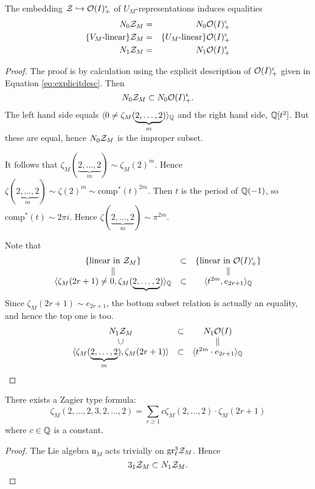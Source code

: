 \begin{prop}
The embedding $\mathcal{Z} \hookrightarrow \mathcal{O}(I)^{\epsilon}_+$ of $U_M$-representations induces equalities
\begin{eqnarray*}
N_0 \mathcal{Z}_M & = & N_0 \mathcal{O}(I)^{\epsilon}_+ \\
\{\textrm{$V_M$-linear}\}\mathcal{Z}_M & = & \{ \textrm{$U_M$-linear} \} \mathcal{O}(I)^{\epsilon}_+ \\
N_1 \mathcal{Z}_M & = & N_1 \mathcal{O}(I)^{\epsilon}_+
\end{eqnarray*}
\end{prop}
\begin{proof}
The proof is by calculation using the explicit description of $\mathcal{O}(I)^{\epsilon}_+$ given in Equation \ref{eq:explicitdesc}. Then
\[
N_0 \mathcal{Z}_M \subset N_0 \mathcal{O}(I)_+^{\epsilon}.
\]
The left hand side equals $\langle 0 \neq \zeta_M(\underbrace{2, \ldots, 2}_m) \rangle_{\mathbb{Q}}$ and the right hand side, $\mathbb{Q}[t^2]$. But these are equal, hence $N_0 \mathcal{Z}_M$ is the improper subset.

\begin{rem}
It follows that $\zeta_M(\underbrace{2, \ldots, 2}_m) \sim \zeta_M(2)^m$. Hence $\zeta(\underbrace{2, \ldots, 2}_m) \sim \zeta(2)^m \sim \mathrm{comp}^*(t)^{2m}$. Then $t$ is the period of $\mathbb{Q}(-1)$, so $\mathrm{comp}^*(t) \sim 2\pi i$. Hence $\zeta(\underbrace{2, \ldots, 2}_m) \sim \pi^{2m}$.
\end{rem}
Note that
\[
\begin{array}{ccc}
\{ \textrm{linear in $\mathcal{Z}_M$} \} & \subset & \{ \textrm{linear in $\mathcal{O}(I)^{\epsilon}_+$} \} \\
\parallel & & \parallel \\
\langle \zeta_M(2r+1) \neq 0, \zeta_M(\underbrace{2,\ldots,2}) \rangle_{\mathbb{Q}} & \subset & \langle t^{2m}, e_{2r+1} \rangle_{\mathbb{Q}}
\end{array}
\]
Since $\zeta_M(2r+1) \sim e_{2r+1}$, the bottom subset relation is actually an equality, and hence the top one is too.
\[
\begin{array}{ccc}
N_1 \mathcal{Z}_M & \subset & N_1 \mathcal{O}(I) \\
\cup & & \parallel \\
\langle \zeta_M(\underbrace{2, \ldots, 2}_m), \zeta_M(2r+1) \rangle & \subset & \langle t^{2m} \cdot e_{2r+1} \rangle_{\mathbb{Q}}
\end{array}
\]
\end{proof}

\begin{cor}
There exists a Zagier type formula:
\[
\zeta_M(2, \ldots, 2, 3, 2, \ldots, 2) = \sum_{r \geq 1} c \zeta_M(2, \ldots, 2) \cdot \zeta_M(2r+1)
\]
where $c \in \mathbb{Q}$ is a constant.
\end{cor}
\begin{proof}
The Lie algebra $\mathfrak{u}_M$ acts trivially on $\mathrm{gr}^3_{\ell} \mathcal{Z}_M$. Hence
\[
3_1\mathcal{Z}_M \subset N_1 \mathcal{Z}_M.
\]
\end{proof}

